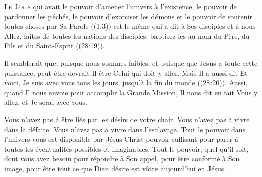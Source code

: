 



\lettrine{L}{e Jésus} qui avait le pouvoir d'amener l'univers
 à l'existence, le pouvoir de pardonner les péchés,
 le pouvoir d'exorciser les démons et le pouvoir de soutenir
 toutes choses par Sa Parole ((1:3))
 est le même qui a dit à Ses disciples \ocadr et à nous \fcadr{}\frcolon{} 
 \Og Allez, faites de toutes les nations des disciples,
 baptisez-les au nom du Père, du Fils et du Saint-Esprit \Fg{}
 ((28:19)). 

Il semblerait que, puisque nous sommes faibles, et puisque que Jésus
 a toute cette puissance, peut-être devrait-Il être Celui qui doit y aller.
 Mais Il a aussi dit\frcolon{} 
 \Og Et voici, Je suis avec vous tous les jours,
 jusqu'à la fin du monde \Fg{} ((28:20)).
 Aussi, quand Il nous envoie pour accomplir la Grande Mission,
 Il nous dit en fait\frcolon{} 
 \Og Vous y allez, et Je serai avec vous. \Fg{}



Vous n'avez pas à être liés par les désirs de votre chair.
 Vous n'avez pas à vivre dans la défaite. Vous n'avez pas à vivre
 dans l'esclavage. Tout le pouvoir dans l'univers vous est disponible
 par Jésus-Christ \ocadr pouvoir suffisant pour parer à toutes
 les éventualités possibles et imaginables.
 Tout le pouvoir, quel qu'il soit, dont vous avez besoin
 pour répondre à Son appel, pour être conformé à Son image,
 pour être tout ce que Dieu désire est vôtre aujourd'hui en Jésus. 

\dvrule



